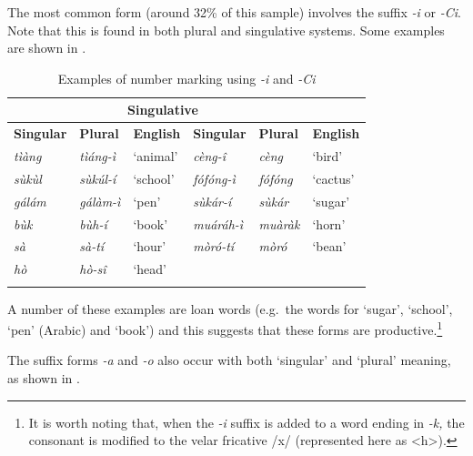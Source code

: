 \documentclass[output=paper]{langsci/langscibook}
\begin{document}
The most common form (around 32\% of this sample) involves the suffix \textit{-i} or \textit{-Ci}. Note that this is found in both plural and singulative systems. Some examples are shown in .  

\begin{table}
\begin{tabularx}{\textwidth}{XXXXXX}
\lsptoprule

\multicolumn{3}{c}{ \textbf{Plurative}} & \multicolumn{3}{c}{ \textbf{Singulative}}\\ \midrule
 \textbf{Singular} & \textbf{Plural} & \textbf{English} & \textbf{Singular} & \textbf{Plural} & \textbf{English}\\ \midrule
\itshape t\`{i}\`{a}ng & \itshape t\`{i}\'{a}ng-\`{i} & ‘animal’ & \itshape c\`{e}ng-\^{i} & \itshape c\`{e}ng & ‘bird’\\
\itshape s\`{u}k\`{u}l & \itshape s\`{u}k\'{u}l-\'{i} & ‘school’ & \itshape f\'{o}f\'{o}ng-\`{i} & \itshape f\'{o}f\'{o}ng & ‘cactus’\\
\itshape g\'{a}l\'{a}m & \itshape g\'{a}l\`{a}m-\`{i} & ‘pen’ & \itshape s\`{u}k\'{a}r-\'{i} & \itshape s\`{u}k\'{a}r & ‘sugar’\\
\itshape b\`{u}k & \itshape b\`{u}h-\'{i} & ‘book’ & \itshape mu\'{a}r\'{a}h-\`{i} & \itshape mu\`{a}r\`{a}k & ‘horn’\\
\itshape s\`{a} & \itshape s\`{a}-t\'{i} & ‘hour’ & \itshape m\`{o}r\'{o}-t\'{i} & \itshape m\`{o}r\'{o} & ‘bean’\\
\itshape h\`{o} & \itshape h\`{o}-s\^{i} & ‘head’ &  &  & \\
\lspbottomrule
\end{tabularx}
\caption{Examples of number marking using \textit{-i} and \textit{{}-Ci}}
\label{tab:moodie:10}
\end{table}

A number of these examples are loan words (e.g.\ the words for ‘sugar’, ‘school’, ‘pen’ (Arabic) and ‘book’) and this suggests that these forms are productive.\footnote{ It is worth noting that, when the \textit{{}-i} suffix is added to a word ending in \textit{{}-k,} the consonant is modified to the velar fricative /x/ (represented here as {\textless}h{\textgreater}).} 

The suffix forms \textit{{}-a }and \textit{{}-o} also occur with both `singular' and `plural' meaning, as shown in . 
\end{document}
